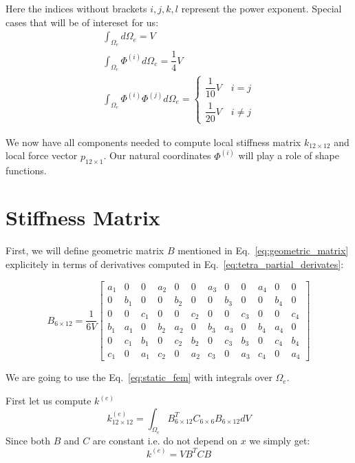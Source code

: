 \documentclass[en]{minipw} %
\begin{document}
Here the indices without brackets $i,j,k,l$ represent the power exponent.
Special cases that will be of intereset for us:
\begin{equation}
\label{eq:anal_intergral}
\begin{aligned}
\int_{\Omega_{e}} d \Omega_{e} = V
\\
\int_{\Omega_{e}} \Phi^{(i)} d \Omega_{e} = \dfrac{1}{4}V
\\
\int_{\Omega_{e}} \Phi^{(i)} \Phi^{(j)} d \Omega_{e} = 
\begin{cases}
\dfrac{1}{10} V \quad i = j 
\\
\dfrac{1}{20} V \quad i \neq j
\end{cases}
\end{aligned}
\end{equation}

We now have all components needed to compute local stiffness matrix $k_{12 \times 12}$ and local force vector $p_{12 \times 1}$. Our natural coordinates $\Phi^{(i)}$ will play a role of shape functions.

\section{Stiffness Matrix}

First, we will define geometric matrix $B$ mentioned in Eq.~\ref{eq:geometric_matrix} explicitely in terms of derivatives computed in Eq.~\ref{eq:tetra_partial_derivates}:

\begin{equation}
\label{eq:geometric_matrix}
B_{6 \times 12} = \dfrac{1}{6V}
\begin{bmatrix}
a_1 & 0 & 0 & a_2 & 0 & 0 & a_3 & 0 & 0 & a_4 & 0 & 0 \\
0 & b_1 & 0 & 0 & b_2 & 0 & 0 & b_3 & 0 & 0 & b_4 & 0 \\
0 & 0 & c_1 & 0 & 0 & c_2 & 0 & 0 & c_3 & 0 & 0 & c_4 \\
b_1 & a_1 & 0 & b_2 & a_2 & 0 & b_3 & a_3 & 0 & b_4 & a_4 & 0 \\
0 & c_1 & b_1 & 0 & c_2 & b_2 & 0 & c_3 & b_3 & 0 & c_4 & b_4 \\
c_1 & 0 & a_1 & c_2 & 0 & a_2 & c_3 & 0 & a_3 & c_4 & 0 & a_4
\end{bmatrix}
\end{equation}

We are going to use the Eq.~\ref{eq:static_fem} with integrals over $\Omega_{e}$. 

First let us compute $k^{(e)}$
\begin{equation}
k^{(e)}_{12 \times 12} = \int_{\Omega_{e}} B^{T}_{6 \times 12} C_{6 \times 6} B_{6 \times 12} dV 
\end{equation}
Since both $B$ and $C$ are constant i.e. do not depend on $x$ we simply get:
\begin{equation}
k^{(e)} = V B^{T} C B 
\end{equation}
\end{document}
